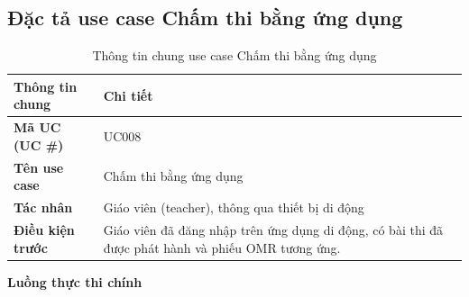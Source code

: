 ﻿\documentclass[../DoAn.tex]{subfiles}
\begin{document}
\subsection{Đặc tả use case Chấm thi bằng ứng dụng}
\label{subsection:2.3.4}
\begin{table}[H]
\centering
\begin{tabular}{|p{4cm}|p{10cm}|}
\hline
\textbf{Thông tin chung} & \textbf{Chi tiết} \\ \hline
\textbf{Mã UC (UC \#)} & UC008 \\ \hline
\textbf{Tên use case} & Chấm thi bằng ứng dụng \\ \hline
\textbf{Tác nhân} & Giáo viên (teacher), thông qua thiết bị di động \\ \hline
\textbf{Điều kiện trước} & Giáo viên đã đăng nhập trên ứng dụng di động, có bài thi đã được phát hành và phiếu OMR tương ứng. \\ \hline
\end{tabular}
\caption{Thông tin chung use case Chấm thi bằng ứng dụng}
\label{table:2.3.4_info}
\end{table}
\noindent\textbf{Luồng thực thi chính}
\end{document}
